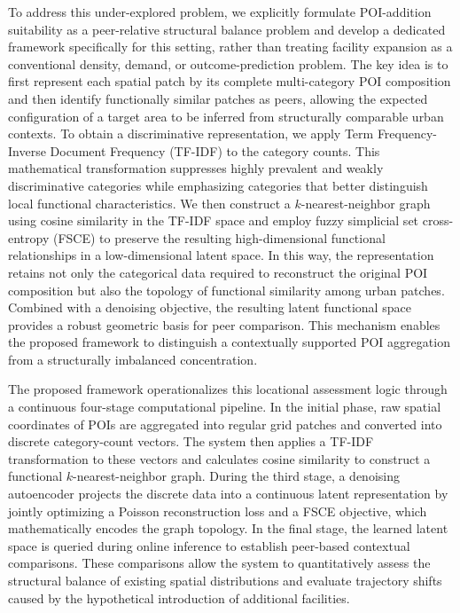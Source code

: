 \documentclass[sigconf]{acmart}
\begin{document}
To address this under-explored problem, we explicitly formulate POI-addition suitability as a peer-relative structural balance problem and develop a dedicated framework specifically for this setting, rather than treating facility expansion as a conventional density, demand, or outcome-prediction problem. The key idea is to first represent each spatial patch by its complete multi-category POI composition and then identify functionally similar patches as peers, allowing the expected configuration of a target area to be inferred from structurally comparable urban contexts. To obtain a discriminative representation, we apply Term Frequency-Inverse Document Frequency (TF-IDF) to the category counts. This mathematical transformation suppresses highly prevalent and weakly discriminative categories while emphasizing categories that better distinguish local functional characteristics. We then construct a $k$-nearest-neighbor graph using cosine similarity in the TF-IDF space and employ fuzzy simplicial set cross-entropy (FSCE) to preserve the resulting high-dimensional functional relationships in a low-dimensional latent space. In this way, the representation retains not only the categorical data required to reconstruct the original POI composition but also the topology of functional similarity among urban patches. Combined with a denoising objective, the resulting latent functional space provides a robust geometric basis for peer comparison. This mechanism enables the proposed framework to distinguish a contextually supported POI aggregation from a structurally imbalanced concentration.  

The proposed framework operationalizes this locational assessment logic through a continuous four-stage computational pipeline. In the initial phase, raw spatial coordinates of POIs are aggregated into regular grid patches and converted into discrete category-count vectors. The system then applies a TF-IDF transformation to these vectors and calculates cosine similarity to construct a functional $k$-nearest-neighbor graph. During the third stage, a denoising autoencoder projects the discrete data into a continuous latent representation by jointly optimizing a Poisson reconstruction loss and a FSCE objective, which mathematically encodes the graph topology. In the final stage, the learned latent space is queried during online inference to establish peer-based contextual comparisons. These comparisons allow the system to quantitatively assess the structural balance of existing spatial distributions and evaluate trajectory shifts caused by the hypothetical introduction of additional facilities. 
\end{document}
